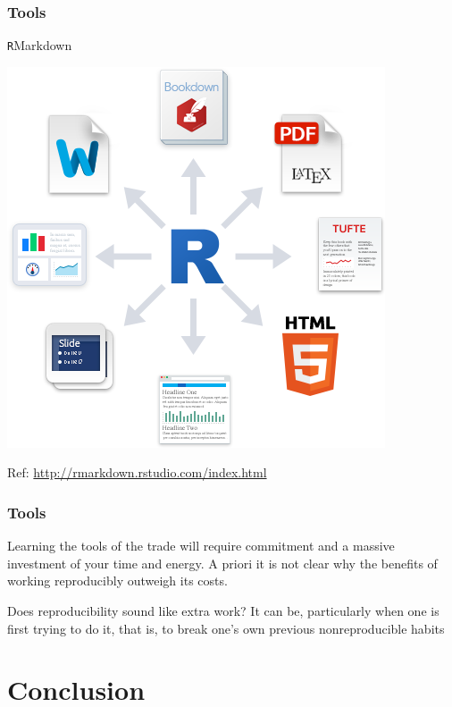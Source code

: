 \documentclass{beamer}
\begin{document}

\begin{frame}
\frametitle{Tools}
\begin{center}\Large\texttt{R}Markdown\end{center}
\begin{center}\includegraphics[scale=0.35]{figures/RMarkdownOutputFormats.png}\end{center}
\begin{center}\tiny Ref: {\url{http://rmarkdown.rstudio.com/index.html}}\end{center}
\end{frame}


\begin{frame}
\frametitle{Tools}


Learning the tools of the trade will require commitment and a massive investment of your time and energy. A priori it is not clear why the benefits of working reproducibly outweigh its costs.

Does reproducibility sound like extra work? It can be, particularly when one is first trying to do it, that is, to break one's own previous nonreproducible habits


\end{frame}

\section{Conclusion}
\end{document}
